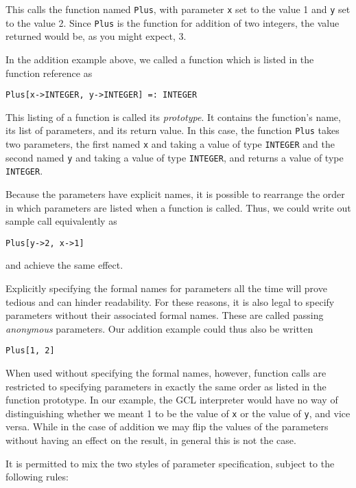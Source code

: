 This calls the function named {\tt Plus}, with parameter \verb+x+ set
to the value 1 and \verb+y+ set to the value 2.  Since {\tt Plus} is
the function for addition of two integers, the value returned would
be, as you might expect, 3.

In the addition example above, we called a function which is listed in
the function reference as

\begin{verbatim}
Plus[x->INTEGER, y->INTEGER] =: INTEGER
\end{verbatim}

\noindent This listing of a function is called its {\it prototype}.  
It contains the function's name, its list of parameters, and its return
value.  In this case, the function {\tt Plus} takes two parameters, the
first named \verb+x+ and taking a value of type {\tt INTEGER} and the
second named \verb+y+ and taking a value of type {\tt INTEGER}, and
returns a value of type {\tt INTEGER}.

Because the parameters have explicit names, it is possible to rearrange
the order in which parameters are listed when a function is called.
Thus, we could write out sample call equivalently as

\begin{verbatim}
Plus[y->2, x->1]
\end{verbatim}

\noindent and achieve the same effect.

Explicitly specifying the formal names for parameters all the time
will prove tedious and can hinder readability.  For these reasons, it is
also legal to specify parameters without their associated formal names.
These are called passing {\it anonymous} parameters.  Our addition
example could thus also be written

\begin{verbatim}
Plus[1, 2]
\end{verbatim}

When used without specifying the formal names, however, function
calls are restricted to specifying parameters in exactly the same
order as listed in the function prototype.  In our example, the GCL
interpreter would have no way of distinguishing whether we meant 1 to
be the value of \verb+x+ or the value of \verb+y+, and vice versa.
While in the case of addition we may flip the values of the parameters
without having an effect on the result, in general this is not the
case.

It is permitted to mix the two styles of parameter specification,
subject to the following rules:

